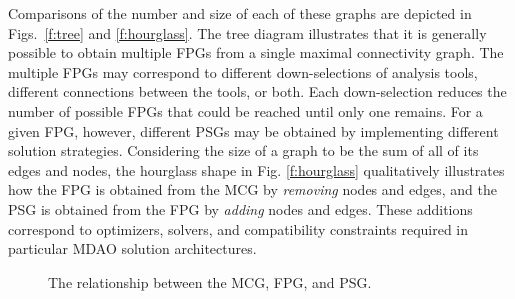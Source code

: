   Comparisons of the number and size of each of these graphs are depicted in Figs.~\ref{f:tree} and \ref{f:hourglass}. 
  The tree diagram illustrates that it is generally possible to obtain 
  multiple FPGs from a single maximal connectivity graph. The multiple FPGs may correspond to 
  different down-selections of analysis tools, different connections between the tools, 
  or both. Each down-selection reduces the number of possible FPGs that could be reached 
  until only one remains. For a given FPG, however, different PSGs may be obtained by implementing 
  different solution strategies. Considering the size of a graph to be the sum of all of its
  edges and nodes, the hourglass shape in Fig. \ref{f:hourglass} qualitatively illustrates how
  the FPG is obtained from the MCG by \emph{removing} nodes and edges, 
  and the PSG is obtained from the FPG by \emph{adding} nodes and edges.
These additions correspond to optimizers, solvers, and compatibility constraints required in particular MDAO solution architectures.
\begin{figure}[htb!]
    \centering
  \caption{The relationship between the MCG, FPG, and PSG.}
  \end{figure}